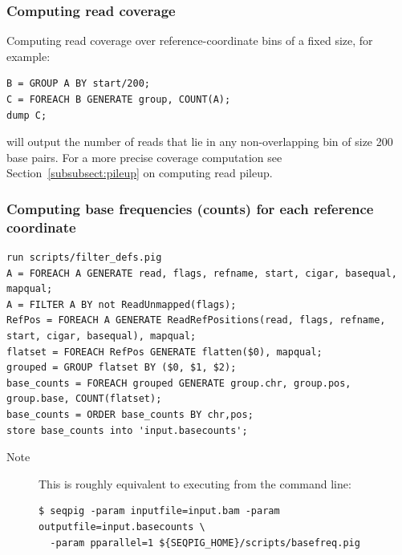  \subsubsection{Computing read coverage}
Computing read coverage over reference-coordinate bins of a fixed size,
for example:
\begin{lstlisting}
B = GROUP A BY start/200;
C = FOREACH B GENERATE group, COUNT(A);
dump C; 
\end{lstlisting}
will output the number of reads that lie in any non-overlapping bin of size 200 base pairs.
For a more precise coverage computation see Section~\ref{subsubsect:pileup} on computing
read pileup.

 \subsubsection{Computing base frequencies (counts) for each reference coordinate}

\begin{lstlisting}
run scripts/filter_defs.pig
A = FOREACH A GENERATE read, flags, refname, start, cigar, basequal, mapqual;
A = FILTER A BY not ReadUnmapped(flags);
RefPos = FOREACH A GENERATE ReadRefPositions(read, flags, refname, start, cigar, basequal), mapqual;
flatset = FOREACH RefPos GENERATE flatten($0), mapqual;
grouped = GROUP flatset BY ($0, $1, $2);
base_counts = FOREACH grouped GENERATE group.chr, group.pos, group.base, COUNT(flatset);
base_counts = ORDER base_counts BY chr,pos;
store base_counts into 'input.basecounts';
\end{lstlisting}
\begin{description}
	\item[Note] This is roughly equivalent to executing from the command line:
\begin{lstlisting}
$ seqpig -param inputfile=input.bam -param outputfile=input.basecounts \
  -param pparallel=1 ${SEQPIG_HOME}/scripts/basefreq.pig 
\end{lstlisting}
\end{description}

